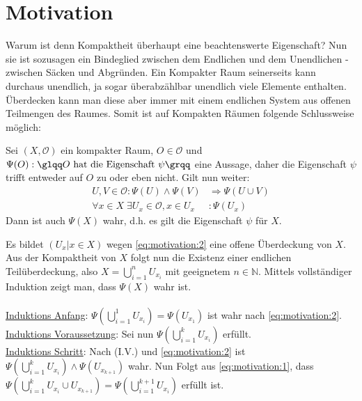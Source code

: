 \section{Motivation}
Warum ist denn Kompaktheit überhaupt eine beachtenswerte Eigenschaft? Nun sie ist sozusagen ein Bindeglied zwischen dem 
Endlichen und dem Unendlichen - zwischen Säcken und Abgründen. Ein Kompakter Raum seinerseits 
kann durchaus unendlich, ja sogar überabzählbar unendlich viele Elemente enthalten. Überdecken kann man diese aber immer mit
einem endlichen System aus offenen Teilmengen des Raumes. Somit ist auf Kompakten Räumen folgende Schlussweise möglich:
\\
\begin{Satz}
	Sei \( (X, \mathcal{O}) \) ein kompakter Raum, \(O \in \mathcal{O}\) und 
	\( \Psi(O) : \mbox{\glqq} O \mbox{ hat die Eigenschaft } \psi \mbox{\grqq} \) eine Aussage, 
	daher die Eigenschaft \(\psi\) trifft entweder auf \(O\) zu oder eben nicht.
	Gilt nun weiter:
	\begin{align}
		U, V \in \mathcal{O} : \Psi(U) \land \Psi(V) &\Rightarrow \Psi(U \cup V) \label{eq:motivation:1}\\
		\forall x \in X \; \exists U_x \in \mathcal{O}, x \in U_x &: \Psi(U_x) \label{eq:motivation:2}
	\end{align}
	Dann ist auch \(\Psi(X)\) wahr, d.h. es gilt die Eigenschaft \(\psi\) für \(X\).
\end{Satz}
%
	Es bildet \( (U_x | x \in X) \) wegen \eqref{eq:motivation:2} eine offene Überdeckung von \(X\). Aus der Kompaktheit von \(X\) folgt nun 
	die Existenz einer endlichen Teilüberdeckung, also \(X =  \bigcup_{i=1}^{n} U_{x_i}\) mit geeignetem \( n \in \mathbb{N} \). 
	Mittels vollständiger Induktion zeigt man, dass \(\Psi(X)\) wahr ist.
	\\
	\\
	\underline{Induktions Anfang}: \(\Psi(\bigcup_{i=1}^{1} U_{x_i}) = \Psi(U_{x_1}) \) ist wahr nach \eqref{eq:motivation:2}.
	\\
	\underline{Induktions Voraussetzung}: Sei nun \( \Psi(\bigcup_{i=1}^{k} U_{x_i}) \) erfüllt.
	\\
	\underline{Induktions Schritt}: Nach (I.V.) und \eqref{eq:motivation:2} ist \(\Psi(\bigcup_{i=1}^{k} U_{x_i}) \land \Psi(U_{x_{k+1}})\) wahr.
	Nun Folgt aus \eqref{eq:motivation:1}, dass \( \Psi(\bigcup_{i=1}^{k} U_{x_i} \cup U_{x_{k+1}}) = \Psi( \bigcup_{i=1}^{k+1} U_{x_i} ) \) erfüllt ist.
	\\
	\\
